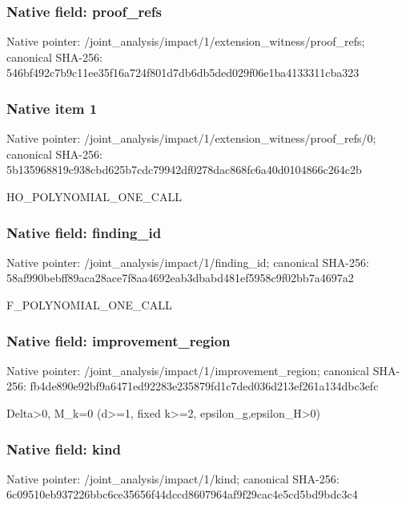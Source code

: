 \documentclass[10pt,a4paper]{article}
\begin{document}
\subsubsection{Native field: proof\_\allowbreak{}refs}
Native pointer: /joint\_\allowbreak{}analysis/impact/1/extension\_\allowbreak{}witness/proof\_\allowbreak{}refs; canonical SHA-256: 546bf492c7b9c11ee35f16a724f801d7db6db5ded029f06e1ba4133311cba323

\subsubsection{Native item 1}
Native pointer: /joint\_\allowbreak{}analysis/impact/1/extension\_\allowbreak{}witness/proof\_\allowbreak{}refs/0; canonical SHA-256: 5b135968819c938cbd625b7cdc79942df0278dac868fc6a40d0104866c264c2b

\begingroup\raggedright\sloppy HO\_\allowbreak{}POLYNOMIAL\_\allowbreak{}ONE\_\allowbreak{}CALL\par\endgroup

\subsubsection{Native field: finding\_\allowbreak{}id}
Native pointer: /joint\_\allowbreak{}analysis/impact/1/finding\_\allowbreak{}id; canonical SHA-256: 58af990bebff89aca28ace7f8aa4692eab3dbabd481ef5958c9f02bb7a4697a2

\begingroup\raggedright\sloppy F\_\allowbreak{}POLYNOMIAL\_\allowbreak{}ONE\_\allowbreak{}CALL\par\endgroup

\subsubsection{Native field: improvement\_\allowbreak{}region}
Native pointer: /joint\_\allowbreak{}analysis/impact/1/improvement\_\allowbreak{}region; canonical SHA-256: fb4de890e92bf9a6471ed92283e235879fd1c7ded036d213ef261a134dbc3efc

\begingroup\raggedright\sloppy Delta>0,\allowbreak{} M\_\allowbreak{}k=\allowbreak{}0 (d>=\allowbreak{}1,\allowbreak{} fixed k>=\allowbreak{}2,\allowbreak{} epsilon\_\allowbreak{}g,\allowbreak{}epsilon\_\allowbreak{}H>0)\par\endgroup

\subsubsection{Native field: kind}
Native pointer: /joint\_\allowbreak{}analysis/impact/1/kind; canonical SHA-256: 6c09510eb937226bbc6ce35656f44dccd8607964af9f29cac4e5cd5bd9bdc3c4
\end{document}
